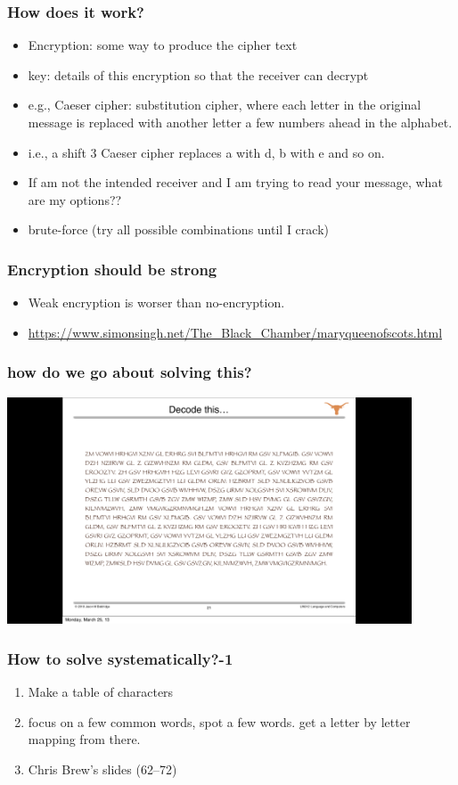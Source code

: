 \documentclass{beamer}
\begin{document}
\begin{frame}
\frametitle{How does it work?}
\begin{itemize}
\item Encryption: some way to produce the cipher text
\item key: details of this encryption so that the receiver can decrypt
\item e.g., Caeser cipher: substitution cipher, where each letter in the original message is replaced with another letter a few numbers ahead in the alphabet. 
\item i.e., a shift 3 Caeser cipher replaces a with d, b with e and so on. \pause
\item If am not the intended receiver and I am trying to read your message, what are my options?? \pause
\item brute-force (try all possible combinations until I crack)
\end{itemize}
\end{frame}

\begin{frame}
\frametitle{Encryption should be strong}
\begin{itemize}
\item Weak encryption is worser than no-encryption.
\item \url{https://www.simonsingh.net/The_Black_Chamber/maryqueenofscots.html}
\end{itemize}
\end{frame}

\begin{frame}
\frametitle{how do we go about solving this?}
\includegraphics[width=0.9\textwidth]{brew.png}
\end{frame}

\begin{frame}
\frametitle{How to solve systematically?-1}
\begin{enumerate}
\item Make a table of characters
\item focus on a few common words, spot a few words. get a letter by letter mapping from there.
\item Chris Brew's slides (62--72)
\end{enumerate}
\end{frame}
\end{document}
